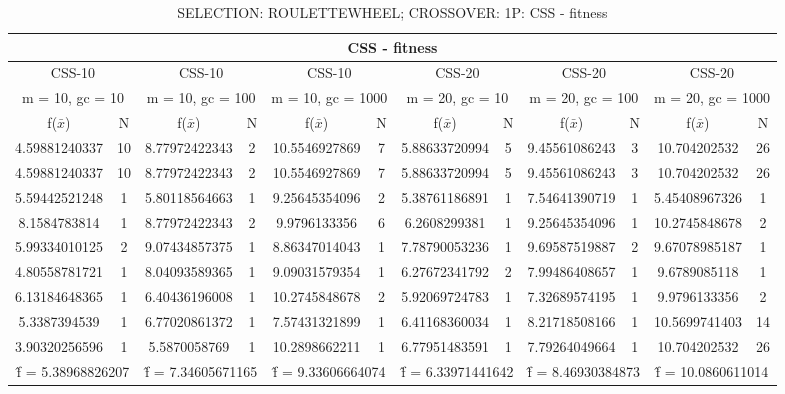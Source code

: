 \begin{table}[H]
	\centering
	\caption{SELECTION: ROULETTEWHEEL; CROSSOVER: 1P: CSS - fitness}
	\begin{adjustbox}{width=1\textwidth}
		\begin{tabular}{ |c|c||c|c||c|c||c|c||c|c||c|c| }
			\hline
			\multicolumn{12}{|c|}{CSS - fitness} \\
			\hline
			\multicolumn{2}{|c||}{CSS-10} & \multicolumn{2}{c||}{CSS-10} & \multicolumn{2}{c||}{CSS-10} & \multicolumn{2}{c||}{CSS-20} & \multicolumn{2}{c||}{CSS-20} & \multicolumn{2}{c|}{CSS-20}\\
			\hline
			\multicolumn{2}{|c||}{m = 10, gc = 10} & \multicolumn{2}{c||}{m = 10, gc = 100} & \multicolumn{2}{c||}{m = 10, gc = 1000} & \multicolumn{2}{c||}{m = 20, gc = 10} & \multicolumn{2}{c||}{m = 20, gc = 100} & \multicolumn{2}{c|}{m = 20, gc = 1000}\\
			\hline
			f($\bar{x}$) & N & f($\bar{x}$) & N & f($\bar{x}$) & N & f($\bar{x}$) & N & f($\bar{x}$) & N & f($\bar{x}$) & N\\
			\hline
			\hline
			4.59881240337 & 10 & 8.77972422343 & 2 & 10.5546927869 & 7 & 5.88633720994 & 5 & 9.45561086243 & 3 & 10.704202532 & 26\\
			\hline
			4.59881240337 & 10 & 8.77972422343 & 2 & 10.5546927869 & 7 & 5.88633720994 & 5 & 9.45561086243 & 3 & 10.704202532 & 26\\
			5.59442521248 & 1 & 5.80118564663 & 1 & 9.25645354096 & 2 & 5.38761186891 & 1 & 7.54641390719 & 1 & 5.45408967326 & 1\\
			8.1584783814 & 1 & 8.77972422343 & 2 & 9.9796133356 & 6 & 6.2608299381 & 1 & 9.25645354096 & 1 & 10.2745848678 & 2\\
			5.99334010125 & 2 & 9.07434857375 & 1 & 8.86347014043 & 1 & 7.78790053236 & 1 & 9.69587519887 & 2 & 9.67078985187 & 1\\
			4.80558781721 & 1 & 8.04093589365 & 1 & 9.09031579354 & 1 & 6.27672341792 & 2 & 7.99486408657 & 1 & 9.6789085118 & 1\\
			6.13184648365 & 1 & 6.40436196008 & 1 & 10.2745848678 & 2 & 5.92069724783 & 1 & 7.32689574195 & 1 & 9.9796133356 & 2\\
			5.3387394539 & 1 & 6.77020861372 & 1 & 7.57431321899 & 1 & 6.41168360034 & 1 & 8.21718508166 & 1 & 10.5699741403 & 14\\
			3.90320256596 & 1 & 5.5870058769 & 1 & 10.2898662211 & 1 & 6.77951483591 & 1 & 7.79264049664 & 1 & 10.704202532 & 26\\
			\hline
			\multicolumn{2}{|c||}{\^{f} = 5.38968826207} & \multicolumn{2}{c||}{\^{f} = 7.34605671165} & \multicolumn{2}{c||}{\^{f} = 9.33606664074} & \multicolumn{2}{c||}{\^{f} = 6.33971441642} & \multicolumn{2}{c||}{\^{f} = 8.46930384873} & \multicolumn{2}{c|}{\^{f} = 10.0860611014}\\
			\hline
		\end{tabular}
	\end{adjustbox}
\end{table}
